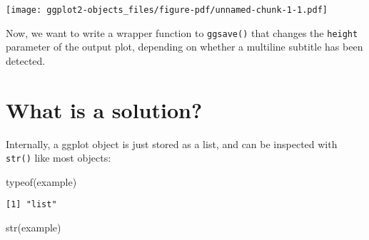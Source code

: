 \documentclass[
  letterpaper,
  DIV=11,
  numbers=noendperiod]{scrreprt}
\newenvironment{Shaded}{\begin{snugshade}}{\end{snugshade}}
\newcommand{\FunctionTok}[1]{\textcolor[rgb]{0.28,0.35,0.67}{#1}}
\newcommand{\NormalTok}[1]{\textcolor[rgb]{0.00,0.23,0.31}{#1}}
\begin{document}
\texttt{[image: ggplot2-objects\_files/figure-pdf/unnamed-chunk-1-1.pdf]}

Now, we want to write a wrapper function to \texttt{ggsave()} that
changes the \texttt{height} parameter of the output plot, depending on
whether a multiline subtitle has been detected.

\section{What is a solution?}\label{what-is-a-solution-1}

Internally, a ggplot object is just stored as a list, and can be
inspected with \texttt{str()} like most objects:

\begin{Shaded}
\begin{Highlighting}[]
\FunctionTok{typeof}\NormalTok{(example)}
\end{Highlighting}
\end{Shaded}

\begin{verbatim}
[1] "list"
\end{verbatim}

\begin{Shaded}
\begin{Highlighting}[]
\FunctionTok{str}\NormalTok{(example)}
\end{Highlighting}
\end{Shaded}
\end{document}
